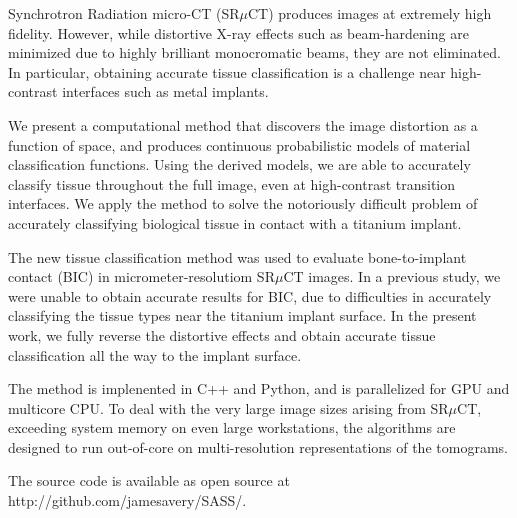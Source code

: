 Synchrotron Radiation micro-CT (SR$\mu$CT) produces images at
extremely high fidelity.  However, while distortive X-ray effects such
as beam-hardening are minimized due to highly brilliant monocromatic
beams, they are not eliminated. In particular, obtaining accurate
tissue classification is a challenge near high-contrast interfaces
such as metal implants.

We present a computational method that discovers the image distortion as a function of space,
and produces continuous probabilistic models of material classification functions.
Using the derived models, we are able to accurately classify tissue throughout the full
image, even at high-contrast transition interfaces.
% 
We apply the method to solve the notoriously difficult problem of accurately classifying
biological tissue in contact with a titanium implant. 
  
The new tissue classification method was used to evaluate
bone-to-implant contact (BIC) in micrometer-resolutiom SR$\mu$CT images.
In a previous study\cite{sporring}, we were unable to obtain accurate
results for BIC, due to difficulties in accurately classifying the
tissue types near the titanium implant surface. In the present work,
we fully reverse the distortive effects and obtain accurate tissue classification
all the way to the implant surface.

The method is implenented in C++ and Python, and is parallelized for GPU and multicore CPU.
To deal with the very large image sizes arising from SR$\mu$CT, exceeding system
memory on even large workstations, the algorithms are designed to run
out-of-core on multi-resolution representations of the tomograms.

The source code is available as open source at http://github.com/jamesavery/SASS/.



